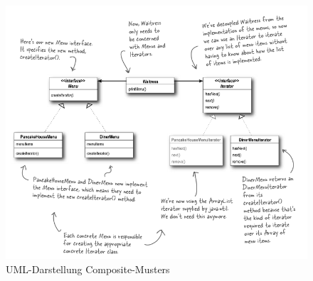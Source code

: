 \FloatBarrier

\begin{figure}
	\centering
	\includegraphics[width=.9\linewidth]{iterator/img/iteratorUML}
	\caption{UML-Darstellung Composite-Musters}
	\label{fig:iteratorUML}
\end{figure}


